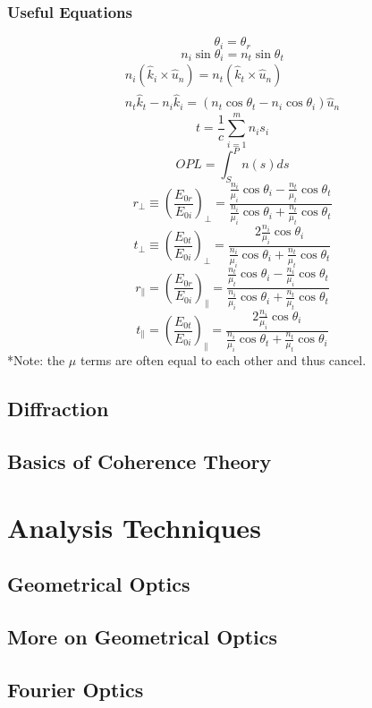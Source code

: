 \documentclass[12pt]{report}
\begin{document}
\section{Useful Equations}
\[\theta_i = \theta_r\]
\[n_i\sin\theta_i = n_t\sin\theta_t\]
\[\begin{array}{c}
n_i(\hat{k}_i \times \hat{u}_n) = n_t (\hat{k}_t \times \hat{u}_n) \\
n_t\hat{k}_t -n_i\hat{k}_i = (n_t\cos\theta_t - n_i\cos\theta_i) \hat{u}_n
\end{array}\]
\[t = \frac{1}{c}\sum_{i=1}^m n_is_i\]
\[OPL = \int_S^P n(s) ds\]
\[r_\perp \equiv \left(\frac{E_{0r}}{E_{0i}}\right)_\perp = \frac{\frac{n_i}{\mu_i}\cos \theta_i-\frac{n_t}{\mu_t}\cos \theta_t}{\frac{n_i}{\mu_i}\cos \theta_i+\frac{n_t}{\mu_t}\cos \theta_t}\]
\[t_\perp \equiv \left(\frac{E_{0t}}{E_{0i}}\right)_\perp = \frac{2 \frac{n_i}{\mu_i}\cos \theta_i}{\frac{n_i}{\mu_i}\cos \theta_i+\frac{n_t}{\mu_t}\cos \theta_t}\]
\[r_\parallel = \left(\frac{E_{0r}}{E_{0i}}\right)_\parallel = \frac{\frac{n_t}{\mu_t}\cos \theta_i-\frac{n_i}{\mu_i}\cos \theta_t}{\frac{n_i}{\mu_i}\cos \theta_i+\frac{n_t}{\mu_t}\cos \theta_t}\]
\[t_\parallel = \left(\frac{E_{0t}}{E_{0i}}\right)_\parallel = \frac{2 \frac{n_i}{\mu_i}\cos \theta_i}{\frac{n_i}{\mu_i}\cos \theta_t+\frac{n_t}{\mu_t}\cos \theta_i}\]
*Note: the $\mu$ terms are often equal to each other and thus cancel. 

\chapter{Diffraction}
\chapter{Basics of Coherence Theory}

\part{Analysis Techniques}
\chapter{Geometrical Optics}
\chapter{More on Geometrical Optics}
\chapter{Fourier Optics}
\end{document}
